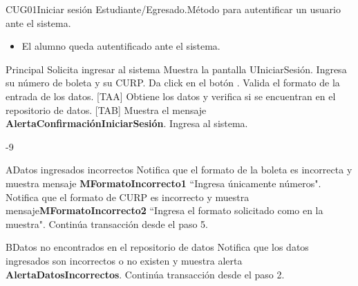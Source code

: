 \begin{UseCase}{CUG01}{Iniciar sesión  Estudiante/Egresado.}{Método para autentificar un usuario ante el sistema.}
{\begin{itemize}
      \item El alumno queda autentificado ante el sistema.
    \end{itemize}
  }
\end{UseCase}

\begin{UCtrayectoria}{Principal}
  \UCpaso[\UCactor] Solicita ingresar al sistema
  \UCpaso Muestra la pantalla UIniciarSesión.
  \UCpaso[\UCactor] Ingresa su número de boleta y su CURP.
  \UCpaso[\UCactor]Da click en el botón .
  \UCpaso Valida el formato de la entrada de los datos. [TAA]
  \UCpaso Obtiene los datos y verifica si se encuentran en el repositorio de datos. [TAB]
  \UCpaso Muestra el mensaje {\bf AlertaConfirmaciónIniciarSesión}.
  \UCpaso[\UCactor]Ingresa al sistema.
\end{UCtrayectoria}
-9

\begin{UCtrayectoriaA}{A}{Datos ingresados incorrectos}
  \UCpaso Notifica que el formato de la boleta es incorrecta y muestra mensaje {\bf MFormatoIncorrecto1} ``Ingresa únicamente números".
  \UCpaso Notifica que el formato de CURP es incorrecto y muestra mensaje{\bf MFormatoIncorrecto2} ``Ingresa el formato solicitado como en la muestra".
  \UCpaso Continúa transacción desde el paso 5.
\end{UCtrayectoriaA}

\begin{UCtrayectoriaA}{B}{Datos no encontrados en el repositorio de datos}
  \UCpaso Notifica que los datos ingresados son incorrectos o no existen y muestra alerta {\bf AlertaDatosIncorrectos}.
  \UCpaso Continúa transacción desde el paso 2.
\end{UCtrayectoriaA}
